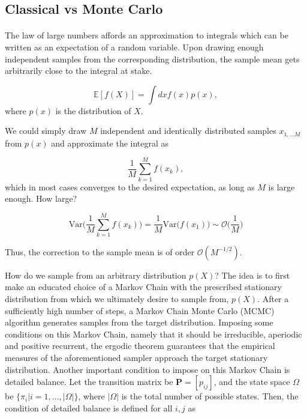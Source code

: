 \documentclass[10pt, twocolumn, twoside]{article}
\begin{document}
\subsection{Classical vs Monte Carlo}\paragraph{}

The law of large numbers affords an approximation to integrals which can be written as an expectation of a random variable. Upon drawing enough independent samples from the corresponding distribution, the sample mean gets arbitrarily close to the integral at stake.

\begin{equation}\label{eq:int_mean}
\mathbb{E} [f(X)] = \int dx f(x) p(x),
\end{equation}
where $p(x)$ is the distribution of $X$. 

We could simply draw $M$ independent and identically distributed samples $x_{1,...M}$ from $p(x)$ and approximate the integral as

\begin{equation}
\frac{1}{M} \sum_{k=1}^M f (x_k) , 
\end{equation}
which in most cases converges to the desired expectation, as long as $M$ is large enough. How large?

\begin{equation}\label{eq:variance}
\text{Var}\bigg( \frac{1}{M} \sum_{k=1}^M f(x_k) \bigg) = \frac{1}{M} \text{Var}\bigg( f(x_1) \bigg) \sim \mathcal{O}\bigg(\frac{1}{M}\bigg)
\end{equation}

Thus, the correction to the sample mean is of order $\mathcal{O}(M^{-1/2})$.

How do we sample from an arbitrary distribution $p(X)$? The idea is to first make an educated choice of a Markov Chain with the prescribed stationary distribution from which we ultimately desire to sample from, $p(X)$. After a sufficiently high number of steps, a Markov Chain Monte Carlo (MCMC) algorithm generates samples from the target distribution. Imposing some conditions on this Markov Chain, namely that it should be irreducible, aperiodic and positive recurrent, the ergodic theorem guarantees that the empirical measures of the aforementioned sampler approach the target stationary distribution. Another important condition to impose on this Markov Chain is detailed balance. Let the transition matrix be $\bm P = [p_{ij}]$, and the state space $\Omega$ be $\{\pi_i | i=1, ..., |\Omega| \}$, where $|\Omega|$ is the total number of possible states. Then, the condition of detailed balance is defined for all $i, j$ as
\end{document}
